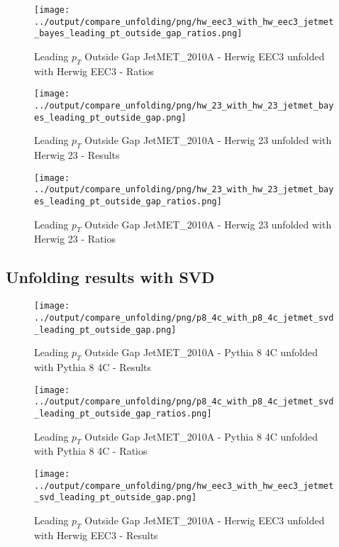 \documentclass[11pt]{book}
\begin{document}
\begin{figure}[ht]
\centering
\texttt{[image: ../output/compare\_unfolding/png/hw\_eec3\_with\_hw\_eec3\_jetmet\_bayes\_leading\_pt\_outside\_gap\_ratios.png]}
\caption{Leading $p_{T}$ Outside Gap JetMET\_2010A - Herwig EEC3 unfolded with Herwig EEC3 - Ratios}
\label{hw_eec3_hw_eec3_jetmet_bayes_leading_pt_outside_gap_b}
\end{figure}

\begin{figure}[ht]
\centering
\texttt{[image: ../output/compare\_unfolding/png/hw\_23\_with\_hw\_23\_jetmet\_bayes\_leading\_pt\_outside\_gap.png]}
\caption{Leading $p_{T}$ Outside Gap JetMET\_2010A - Herwig 23 unfolded with Herwig 23 - Results}
\label{hw_23_hw_23_jetmet_bayes_leading_pt_outside_gap_a}
\end{figure}

\begin{figure}[ht]
\centering
\texttt{[image: ../output/compare\_unfolding/png/hw\_23\_with\_hw\_23\_jetmet\_bayes\_leading\_pt\_outside\_gap\_ratios.png]}
\caption{Leading $p_{T}$ Outside Gap JetMET\_2010A - Herwig 23 unfolded with Herwig 23 - Ratios}
\label{hw_23_hw_23_jetmet_bayes_leading_pt_outside_gap_b}
\end{figure}


\clearpage
\subsection{Unfolding results with SVD}

\begin{figure}[ht]
\centering
\texttt{[image: ../output/compare\_unfolding/png/p8\_4c\_with\_p8\_4c\_jetmet\_svd\_leading\_pt\_outside\_gap.png]}
\caption{Leading $p_{T}$ Outside Gap JetMET\_2010A - Pythia 8 4C unfolded with Pythia 8 4C - Results}
\label{p8_p8_jetmet_svd_leading_pt_outside_gap_a}
\end{figure}

\begin{figure}[ht]
\centering
\texttt{[image: ../output/compare\_unfolding/png/p8\_4c\_with\_p8\_4c\_jetmet\_svd\_leading\_pt\_outside\_gap\_ratios.png]}
\caption{Leading $p_{T}$ Outside Gap JetMET\_2010A - Pythia 8 4C unfolded with Pythia 8 4C - Ratios}
\label{p8_p8_jetmet_svd_leading_pt_outside_gap_b}
\end{figure}

\begin{figure}[ht]
\centering
\texttt{[image: ../output/compare\_unfolding/png/hw\_eec3\_with\_hw\_eec3\_jetmet\_svd\_leading\_pt\_outside\_gap.png]}
\caption{Leading $p_{T}$ Outside Gap JetMET\_2010A - Herwig EEC3 unfolded with Herwig EEC3 - Results}
\label{hw_eec3_hw_eec3_jetmet_svd_leading_pt_outside_gap_a}
\end{figure}
\end{document}
